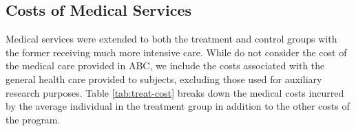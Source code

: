 \begin{comment}
Equipment \& Supplies  & 1,068 & 1,133 &1,133 &1,154 &1,154&5,642 \\ %
Transportation  & 293 & 293 &293 &293 &293 &1,463\\ %
Facilities  & 1,289 & 1,289 &1,289 & 1,289& 1,289&5,445\\ %
Miscellaneous  & 81 & 81 & 81 & 81 & 81&405 \\ %
Food  & 280  & 1,133 &1,417 &1,417 &1,417 &5,664\\ %
\\
\textbf{Total} &3,914&3,994&5,078&5,078&5,078&21,242\\ \hline
\textbf{Total Across Categories}&12,056&13,422&12,501&12,296&12,296&60,788\\ \hline \hline
\end{tabular}
\scriptsize
\begin{tablenotes}
\item Source: \cite{masse2002benefit}. \\
\item Note: this table reports the cost per individual for every year of program participation of the treatment group. All amounts are inflated to 2014 USD. Transportation costs refer to the fuel, general maintenance, insurance cost of daily transportation of treated individuals to and from the center. Costs for facilities are rental costs.
\end{tablenotes}
\end{threeparttable}
\end{table}

\end{comment}

\subsection{Costs of Medical Services} \label{sec:medical}
\noindent Medical services were extended to both the treatment and control groups with the
former receiving much more intensive care. While \cite{Barnett_Masse_2002_benefitcost} do not consider the cost of the medical care provided in ABC, we include the costs associated with the general health care provided to subjects, excluding
those used for auxiliary research purposes.
Table \ref{tab:treat-cost} breaks down the medical costs incurred by the average individual in the treatment group in addition to the other costs of the program. \\

